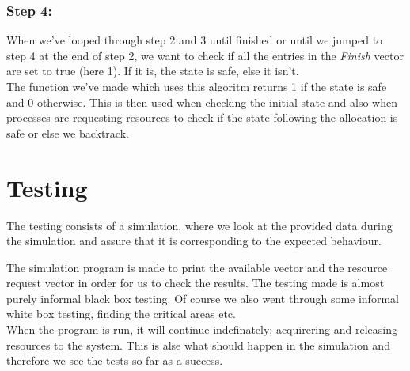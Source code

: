 \subsubsection{Step 4:}
When we've looped through step 2 and 3 until finished or until we jumped to step 4 at the end of step 2, we want to check if all the entries in the \textit{Finish} vector are set to true (here 1). If it is, the state is safe, else it isn't.\\

The function we've made which uses this algoritm returns 1 if the state is safe and 0 otherwise. This is then used when checking the initial state and also when processes are requesting resources to check if the state following the allocation is safe or else we backtrack.

\section{Testing}
The testing consists of a simulation, where we look at the provided data during the simulation and assure that it is corresponding to the expected behaviour.

The simulation program is made to print the available vector and the resource request vector in order for us to check the results. The testing made is almost purely informal black box testing. Of course we also went through some informal white box testing, finding the critical areas etc.\\

When the program is run, it will continue indefinately; acquirering and releasing resources to the system. This is alse what should happen in the simulation and therefore we see the tests so far as a success.\\